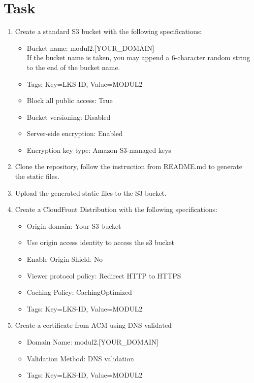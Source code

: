 \documentclass{article}
\begin{document}
\section{Task}
\begin{enumerate}
    \item Create a standard S3 bucket with the following specifications:
    \begin{itemize}
        \item Bucket name: modul2.[YOUR\_DOMAIN]\\
        If the bucket name is taken, you may append a 6-character random string to the end of the bucket name.
        \item Tags: Key=LKS-ID, Value=MODUL2
        \item Block all public access: True
        \item Bucket versioning: Disabled
        \item Server-side encryption: Enabled
        \item Encryption key type: Amazon S3-managed keys
    \end{itemize}
    \item Clone the repository, follow the instruction from README.md to generate the static files. 
    \item Upload the generated static files to the S3 bucket.
    \item Create a CloudFront Distribution with the following specifications:
    \begin{itemize}
        \item Origin domain: Your S3 bucket
        \item Use origin access identity to access the s3 bucket
        \item Enable Origin Shield: No
        \item Viewer protocol policy: Redirect HTTP to HTTPS
        \item Caching Policy: CachingOptimized
        \item Tags: Key=LKS-ID, Value=MODUL2
    \end{itemize}
    \item Create a certificate from ACM using DNS validated
    \begin{itemize}
        \item Domain Name: modul2.[YOUR\_DOMAIN]
        \item Validation Method: DNS validation
        \item Tags: Key=LKS-ID, Value=MODUL2
    \end{itemize}

\end{enumerate}
\end{document}
